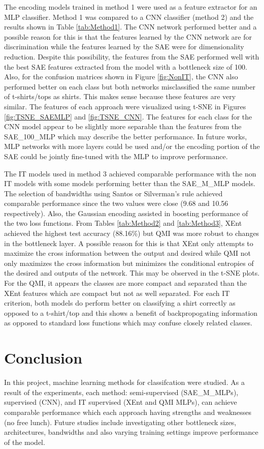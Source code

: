 \documentclass[conference]{IEEEtran}
\begin{document}
	The encoding models trained in method 1 were used as a feature extractor for an MLP classifier. Method 1 was compared to a CNN classifier (method 2) and the results shown in Table \ref{tab:Method1}. The CNN network performed better and a possible reason for this is that the features learned by the CNN network are for discrimination while the features learned by the SAE were for dimensionality reduction. Despite this possibility, the features from the SAE performed well with the best SAE features extracted from the model with a bottleneck size of 100. Also, for the confusion matrices shown in Figure \ref{fig:NonIT}, the CNN also performed better on each class but both networks misclassified the same number of t-shirts/tops as shirts. This makes sense because these features are very similar. The features of each approach were visualized using t-SNE in Figures \ref{fig:TSNE_SAEMLP} and \ref{fig:TSNE_CNN}. The features for each class for the CNN model appear to be slightly more separable than the features from the SAE\_100\_MLP which may describe the better performance. In future works, MLP networks with more layers could be used and/or the encoding portion of the SAE could be jointly fine-tuned with the MLP to improve performance.
	
	The IT models used in method 3 achieved comparable performance with the non IT models with some models performing better than the SAE\_M\_MLP models. The selection of bandwidths using Santos or Silverman's rule achieved comparable performance since the two values were close (9.68 and 10.56 respectively). Also, the Gaussian encoding assisted in boosting performance of the two loss functions. From Tables \ref{tab:Method2} and \ref{tab:Method3}, XEnt achieved the highest test accuracy (88.16\%) but QMI was more robust to changes in the bottleneck layer. A possible reason for this is that XEnt only attempts to maximize the cross information between the output and desired while QMI not only maximizes the cross information but minimizes the conditional entropies of the desired and outputs of the network. This may be observed in the t-SNE plots. For the QMI, it appears the classes are more compact and separated than the XEnt features which are compact but not as well separated. For each IT criterion, both models do perform better on classifying a shirt correctly as opposed to a t-shirt/top and this shows a benefit of backpropogating information as opposed to standard loss functions which may confuse closely related classes.

\section{Conclusion}
	In this project, machine learning methods for classifcation were studied. As a result of the experiments, each method: semi-supervised (SAE\_M\_MLPs), supervised (CNN), and IT supervised (XEnt and QMI MLPs), can achieve comparable performance which each approach having strengths and weaknesses (no free lunch). Future studies include investigating other bottleneck sizes, architectures, bandwidths and also varying training settings improve performance of the model.


\end{document}

